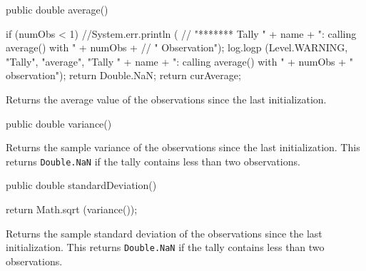 \begin{code}

   public double average() \begin{hide} {
      if (numObs < 1) {
         //System.err.println (
         //    "******* Tally " + name + ":   calling average() with " + numObs +
         //    " Observation");
         log.logp (Level.WARNING, "Tally", "average",
            "Tally " + name + ":   calling average() with " + numObs +
             " observation");
         return Double.NaN;
      }
      return curAverage;
   }\end{hide}
\end{code}
  \begin{tabb}  Returns the average value of the observations since the last
   initialization.
 \end{tabb}
\begin{code}

   public double variance() \begin{hide} {
      // throws NumberObservationException {
      // if (numObs < 2) throw NumberObservationException;
      if (numObs < 2) {
         //System.err.println (
         //    "******* Tally " + name + ":   calling variance() with " + numObs +
         //    " Observation");
         log.logp (Level.WARNING, "Tally", "variance",
            "Tally " + name + ":   calling variance() with " + numObs +
             " observation");
         return Double.NaN;
      }

      return curSum2 / (numObs-1);
   }\end{hide}
\end{code}
  \begin{tabb}  Returns the sample variance of the observations since the last
   initialization.
   This returns \texttt{Double.NaN}
   if the tally contains less than two observations.
 \end{tabb}
\begin{htmlonly}
\end{htmlonly}
\begin{code}

   public double standardDeviation() \begin{hide} {
      return Math.sqrt (variance());
   }\end{hide}
\end{code}
  \begin{tabb}  Returns the sample standard deviation of the observations
   since the last initialization.
   This returns \texttt{Double.NaN}
   if the tally contains less than two observations.
 \end{tabb}
